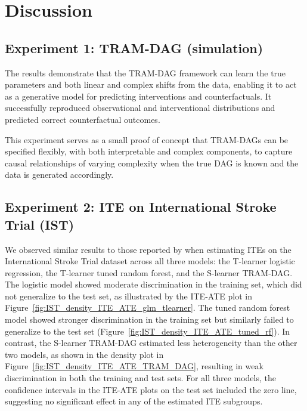 



\chapter{Discussion}




\section{Experiment 1: TRAM-DAG (simulation)}

The results demonstrate that the TRAM-DAG framework can learn the true parameters and both linear and complex shifts from the data, enabling it to act as a generative model for predicting interventions and counterfactuals. It successfully reproduced observational and interventional distributions and predicted correct counterfactual outcomes.

This experiment serves as a small proof of concept that TRAM-DAGs can be specified flexibly, with both interpretable and complex components, to capture causal relationships of varying complexity when the true DAG is known and the data is generated accordingly.



\section{Experiment 2: ITE on International Stroke Trial (IST)}

We observed similar results to those reported by \citet{chen2025} when estimating ITEs on the International Stroke Trial dataset across all three models: the T-learner logistic regression, the T-learner tuned random forest, and the S-learner TRAM-DAG. The logistic model showed moderate discrimination in the training set, which did not generalize to the test set, as illustrated by the ITE-ATE plot in Figure~\ref{fig:IST_density_ITE_ATE_glm_tlearner}. The tuned random forest model showed stronger discrimination in the training set but similarly failed to generalize to the test set (Figure~\ref{fig:IST_density_ITE_ATE_tuned_rf}). In contrast, the S-learner TRAM-DAG estimated less heterogeneity than the other two models, as shown in the density plot in Figure~\ref{fig:IST_density_ITE_ATE_TRAM_DAG}, resulting in weak discrimination in both the training and test sets. For all three models, the confidence intervals in the ITE-ATE plots on the test set included the zero line, suggesting no significant effect in any of the estimated ITE subgroups.

